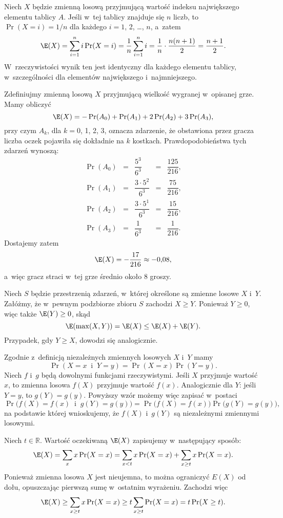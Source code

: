 \exercise %
Niech $X$ będzie zmienną losową przyjmującą wartość indeksu największego elementu tablicy $A$.
Jeśli w~tej tablicy znajduje się $n$ liczb, to $\Pr(X=i)=1/n$ dla każdego $i=1$, 2, \dots, $n$, a~zatem
\[
	\E(X) = \sum_{i=1}^ni\Pr(X=i) = \frac{1}{n}\sum_{i=1}^ni = \frac{1}{n}\cdot\frac{n(n+1)}{2} = \frac{n+1}{2}.
\]
W~rzeczywistości wynik ten jest identyczny dla każdego elementu tablicy, w~szczególności dla elementów największego i~najmniejszego.

\exercise %
Zdefiniujmy zmienną losową $X$ przyjmującą wielkość wygranej w~opisanej grze.
Mamy obliczyć
\[
	\E(X) = -\Pr(A_0)+\Pr(A_1)+2\Pr(A_2)+3\Pr(A_3),
\]
przy czym $A_k$, dla $k=0$, 1, 2, 3, oznacza zdarzenie, że obstawiona przez gracza liczba oczek pojawiła się dokładnie na $k$ kostkach.
Prawdopodobieństwa tych zdarzeń wynoszą:
\[
	\begin{array}{ccccc}
	\Pr(A_0) &=& \dfrac{5^3}{6^3} &=& \dfrac{125}{216}, \\[3mm]
	\Pr(A_1) &=& \dfrac{3\cdot 5^2}{6^3} &=& \dfrac{75}{216}, \\[3mm]
	\Pr(A_2) &=& \dfrac{3\cdot 5^1}{6^3} &=& \dfrac{15}{216}, \\[3mm]
	\Pr(A_3) &=& \dfrac{1}{6^3} &=& \dfrac{1}{216}.
	\end{array}
\]
Dostajemy zatem
\[
	\E(X) = -\dfrac{17}{216} \approx -0{,}08,
\]
a~więc gracz straci w~tej grze średnio około 8 groszy.

\exercise %
Niech $S$ będzie przestrzenią zdarzeń, w~której określone są zmienne losowe $X$ i~$Y$.
Załóżmy, że w~pewnym podzbiorze zbioru $S$ zachodzi $X\ge Y$.
Ponieważ $Y\ge0$, więc także $\E(Y)\ge0$, skąd
\[
    \E(\max(X,Y)) = \E(X) \le \E(X)+\E(Y).
\]
Przypadek, gdy $Y\ge X$, dowodzi się analogicznie.

\exercise %
Zgodnie z~definicją niezależnych zmiennych losowych $X$ i~$Y$ mamy
\[
	\Pr(X=x\;\;\text{i}\;\;Y=y) = \Pr(X=x)\Pr(Y=y).
\]
Niech $f$ i~$g$ będą dowolnymi funkcjami rzeczywistymi.
Jeśli $X$ przyjmuje wartość $x$, to zmienna losowa $f(X)$ przyjmuje wartość $f(x)$.
Analogicznie dla $Y$: jeśli $Y=y$, to $g(Y)=g(y)$.
Powyższy wzór możemy więc zapisać w~postaci
\[
	\Pr\bigl(f(X)=f(x)\;\;\text{i}\;\;g(Y)=g(y)\bigr) = \Pr\bigl(f(X)=f(x)\bigr)\Pr\bigl(g(Y)=g(y)\bigr),
\]
na podstawie której wnioskujemy, że $f(X)$ i~$g(Y)$ są niezależnymi zmiennymi losowymi.

\exercise %
Niech $t\in\mathbb{R}$.
Wartość oczekiwaną $\E(X)$ zapisujemy w~następujący sposób:
\[
    \E(X) = \sum_xx\Pr(X=x) = \sum_{x<t}x\Pr(X=x)+\sum_{x\ge t}x\Pr(X=x).
\]
Ponieważ zmienna losowa $X$ jest nieujemna, to można ograniczyć $E(X)$ od dołu, opuszczając pierwszą sumę w~ostatnim wyrażeniu.
Zachodzi więc
\[
    \E(X) \ge \sum_{x\ge t}x\Pr(X=x) \ge t\sum_{x\ge t}\Pr(X=x) = t\Pr(X\ge t).
\]

